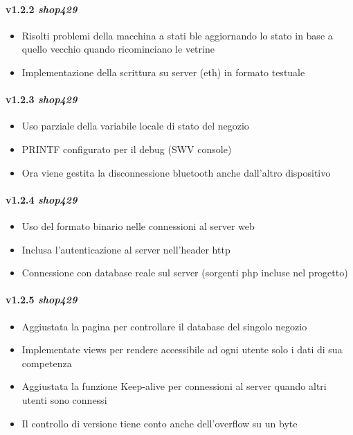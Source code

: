 \paragraph{v1.2.2 \textit{shop429}}
	\begin{itemize}
		\item Risolti problemi della macchina a stati ble aggiornando lo stato in base a quello vecchio quando ricominciano le vetrine
		\item Implementazione della scrittura su server (eth) in formato testuale
	\end{itemize}
\paragraph{v1.2.3 \textit{shop429}}
	\begin{itemize}
		\item Uso parziale della variabile locale di stato del negozio
		\item PRINTF configurato per il debug (SWV console)
		\item Ora viene gestita la disconnessione bluetooth anche dall'altro dispositivo
	\end{itemize}
\paragraph{v1.2.4 \textit{shop429}}
	\begin{itemize}
		\item Uso del formato binario nelle connessioni al server web
		\item Inclusa l'autenticazione al server nell'header http
		\item Connessione con database reale sul server (sorgenti php incluse nel progetto)
	\end{itemize}
\paragraph{v1.2.5 \textit{shop429}}
  \begin{itemize}
  	\item Aggiustata la pagina per controllare il database del singolo negozio
    \item Implementate views per rendere accessibile ad ogni utente solo i dati di sua competenza
    \item Aggiustata la funzione Keep-alive per connessioni al server quando altri utenti sono connessi
    \item Il controllo di versione tiene conto anche dell'overflow su un byte
  \end{itemize}
